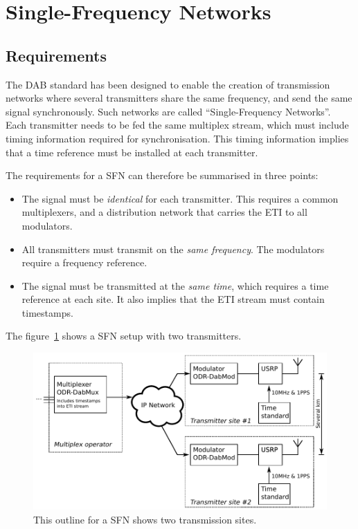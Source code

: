 \section{Single-Frequency Networks}
\subsection{Requirements}
The DAB standard has been designed to enable the creation of transmission
networks where several transmitters share the same frequency, and send the same
signal synchronously. Such networks are called ``Single-Frequency Networks''.
Each transmitter needs to be fed the same multiplex stream, which must include
timing information required for synchronisation. This timing information implies
that a time reference must be installed at each transmitter.

The requirements for a SFN can therefore be summarised in three points:
\begin{itemize}
    \item The signal must be \emph{identical} for each transmitter. This
        requires a common multiplexers, and a distribution network that carries
        the ETI to all modulators.
    \item All transmitters must transmit on the \emph{same frequency}. The modulators
        require a frequency reference.
    \item The signal must be transmitted at the \emph{same time}, which requires
        a time reference at each site. It also implies that the ETI stream must
        contain timestamps.
\end{itemize}


The figure~\ref{fig:txchain-sfn} shows a SFN setup with two transmitters.

\begin{figure}[h]
    \includegraphics[width=\textwidth]{figures/txchain-sfn.pdf}
    \caption{This outline for a SFN shows two transmission sites.}
    \label{fig:txchain-sfn}
\end{figure}

